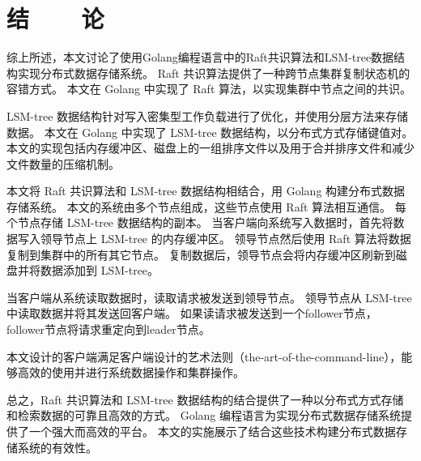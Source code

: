 \section*{结\ \ \ \ 论}

综上所述，本文讨论了使用Golang编程语言中的Raft共识算法和LSM-tree数据结构实现分布式数据存储系统。 Raft 共识算法提供了一种跨节点集群复制状态机的容错方式。 本文在 Golang 中实现了 Raft 算法，以实现集群中节点之间的共识。

	LSM-tree 数据结构针对写入密集型工作负载进行了优化，并使用分层方法来存储数据。 本文在 Golang 中实现了 LSM-tree 数据结构，以分布式方式存储键值对。 本文的实现包括内存缓冲区、磁盘上的一组排序文件以及用于合并排序文件和减少文件数量的压缩机制。
	
	本文将 Raft 共识算法和 LSM-tree 数据结构相结合，用 Golang 构建分布式数据存储系统。 本文的系统由多个节点组成，这些节点使用 Raft 算法相互通信。 每个节点存储 LSM-tree 数据结构的副本。 当客户端向系统写入数据时，首先将数据写入领导节点上 LSM-tree 的内存缓冲区。 领导节点然后使用 Raft 算法将数据复制到集群中的所有其它节点。 复制数据后，领导节点会将内存缓冲区刷新到磁盘并将数据添加到 LSM-tree。
	
	当客户端从系统读取数据时，读取请求被发送到领导节点。 领导节点从 LSM-tree 中读取数据并将其发送回客户端。 如果读请求被发送到一个follower节点，follower节点将请求重定向到leader节点。
	
	本文设计的客户端满足客户端设计的艺术法则（the-art-of-the-command-line），能够高效的使用并进行系统数据操作和集群操作。
	
	总之，Raft 共识算法和 LSM-tree 数据结构的结合提供了一种以分布式方式存储和检索数据的可靠且高效的方式。 Golang 编程语言为实现分布式数据存储系统提供了一个强大而高效的平台。 本文的实施展示了结合这些技术构建分布式数据存储系统的有效性。
	

	
		
	
		 
	
\clearpage